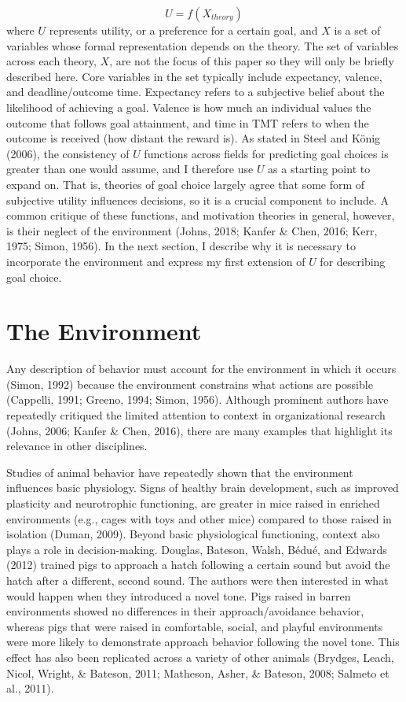 \documentclass[english,,man]{apa6}
\theoremstyle{definition}
\theoremstyle{definition}
\theoremstyle{definition}
\theoremstyle{remark}
\begin{document}
\begin{equation}
U = f(X_{theory})
\end{equation} \noindent where \(U\) represents utility, or a preference
for a certain goal, and \(X\) is a set of variables whose formal
representation depends on the theory. The set of variables across each
theory, \(X\), are not the focus of this paper so they will only be
briefly described here. Core variables in the set typically include
expectancy, valence, and deadline/outcome time. Expectancy refers to a
subjective belief about the likelihood of achieving a goal. Valence is
how much an individual values the outcome that follows goal attainment,
and time in TMT refers to when the outcome is received (how distant the
reward is). As stated in Steel and König (2006), the consistency of
\(U\) functions across fields for predicting goal choices is greater
than one would assume, and I therefore use \(U\) as a starting point to
expand on. That is, theories of goal choice largely agree that some form
of subjective utility influences decisions, so it is a crucial component
to include. A common critique of these functions, and motivation
theories in general, however, is their neglect of the environment
(Johns, 2018; Kanfer \& Chen, 2016; Kerr, 1975; Simon, 1956). In the
next section, I describe why it is necessary to incorporate the
environment and express my first extension of \(U\) for describing goal
choice.

\hypertarget{the-environment}{%
\section{The Environment}\label{the-environment}}

Any description of behavior must account for the environment in which it
occurs (Simon, 1992) because the environment constrains what actions are
possible (Cappelli, 1991; Greeno, 1994; Simon, 1956). Although prominent
authors have repeatedly critiqued the limited attention to context in
organizational research (Johns, 2006; Kanfer \& Chen, 2016), there are
many examples that highlight its relevance in other disciplines.

Studies of animal behavior have repeatedly shown that the environment
influences basic physiology. Signs of healthy brain development, such as
improved plasticity and neurotrophic functioning, are greater in mice
raised in enriched environments (e.g., cages with toys and other mice)
compared to those raised in isolation (Duman, 2009). Beyond basic
physiological functioning, context also plays a role in decision-making.
Douglas, Bateson, Walsh, Bédué, and Edwards (2012) trained pigs to
approach a hatch following a certain sound but avoid the hatch after a
different, second sound. The authors were then interested in what would
happen when they introduced a novel tone. Pigs raised in barren
environments showed no differences in their approach/avoidance behavior,
whereas pigs that were raised in comfortable, social, and playful
environments were more likely to demonstrate approach behavior following
the novel tone. This effect has also been replicated across a variety of
other animals (Brydges, Leach, Nicol, Wright, \& Bateson, 2011;
Matheson, Asher, \& Bateson, 2008; Salmeto et al., 2011).
\end{document}
